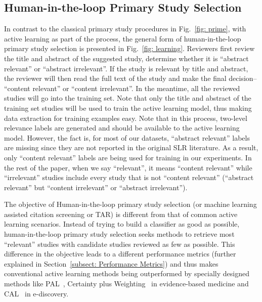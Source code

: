 \documentclass{svjour3}
\theoremstyle{break}
\begin{document}
\subsection{Human-in-the-loop Primary Study Selection}
\label{subsect: Learning based Primary Study Selection}


In contrast to the classical primary study procedures in Fig.~\ref{fig: prime}, with active learning as part of the process, the general form of human-in-the-loop primary study selection is presented in
Fig.~\ref{fig: learning}. Reviewers first review the title and abstract of the
suggested study, determine whether it is ``abstract relevant'' or ``abstract irrelevant''. If the study is relevant by title and abstract, the reviewer will then read the full text of the study and make the final decision-- ``content relevant'' or ``content irrelevant''. In the meantime, all the reviewed
studies will go into the training set. Note that only the title and abstract of the training set studies will be used to train the active learning model, thus making data extraction for training examples easy. Note that in this process, two-level relevance labels are generated and should be available to the active learning model. However, the fact is, for most of our datasets, ``abstract relevant'' labels are missing since they are not reported in the original SLR literature. As a result, only ``content relevant'' labels are being used for training in our experiments. In the rest of the paper, when we say ``relevant'', it means ``content relevant'' while ``irrelevant'' studies include every study that is not ``content relevant'' (``abstract relevant'' but ``content irrelevant'' or ``abstract irrelevant'').

The objective of Human-in-the-loop primary study selection (or machine learning
assisted citation screening or TAR) is different from that of common active
learning scenarios. Instead of trying to build a classifier as good as possible,
human-in-the-loop primary study selection seeks methods to retrieve most
``relevant'' studies with candidate studies reviewed as few as possible. This
difference in the objective leads to a different performance metrics (further explained in Section~\ref{subsect: Performance Metrics}) and thus
makes conventional active learning methods being outperformed by specially
designed methods like PAL~\cite{wallace2010semi}, Certainty plus Weighting~\cite{miwa2014reducing} in evidence-based
medicine and CAL~\cite{cormack2014evaluation,cormack2015autonomy} in
e-discovery.
\end{document}
